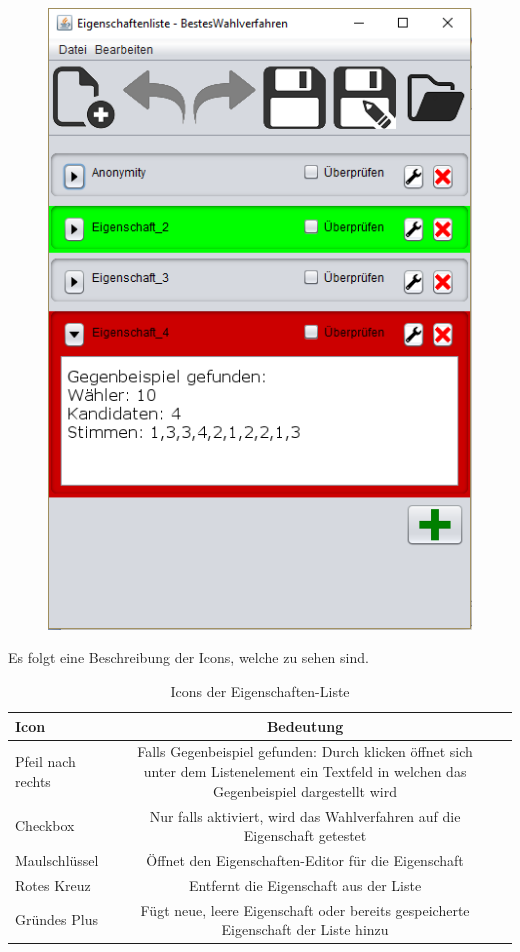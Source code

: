 \documentclass[a4paper]{scrreprt}
\begin{document}
\begin{figure}[H]
\begin{minipage}{.5\textwidth}
  \includegraphics[scale=0.5]{gegenbeispiel.png}
  \label{fig:sub2}
\end{minipage}
\end{figure}

Es folgt eine Beschreibung der Icons, welche zu sehen sind.

\begin{table}[H]
\begin{tabular}{lcr} 
Icon & Bedeutung \\
\hline
Pfeil nach rechts & Falls Gegenbeispiel gefunden: Durch klicken öffnet sich unter dem Listenelement ein Textfeld in welchen das Gegenbeispiel dargestellt wird \\
Checkbox & Nur falls aktiviert, wird das Wahlverfahren auf die Eigenschaft getestet \\
Maulschlüssel & Öffnet den Eigenschaften-Editor für die Eigenschaft\\
Rotes Kreuz & Entfernt die Eigenschaft aus der Liste \\
Gründes Plus & Fügt neue, leere Eigenschaft oder bereits gespeicherte Eigenschaft der Liste hinzu
\end{tabular}
\label{Eigenschaftenliste-Bearbeiten-Menüpunkte}
\caption{Icons der Eigenschaften-Liste}
\end{table}
\end{document}
